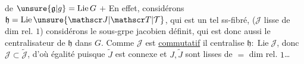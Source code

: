 de $\unsure{\mathfrak g|g}=\operatorname{Lie}G$ $+$  En effet, considérons $\mathfrak h=\operatorname{Lie}\unsure{\mathscr J|\mathscr T|\mathcal T}$, qui est un tel ss-fibré, ($\mathscr J$ lisse de dim rel. $1$)
considérons le  sous-grpe jacobien  définit, qui est donc aussi le centralisateur de $\mathfrak h$ dans $G$.
 Comme $\mathscr J$ est \uline{commutatif} il centralise $\mathfrak h:\operatorname{Lie}\mathscr J$, donc $\mathscr J\subset\widetilde{\mathscr J}$, d'où égalité puisque $\widetilde J$ est connexe et $J,\widetilde J$ sont lisses de $=$ dim rel. $1$\ldots
